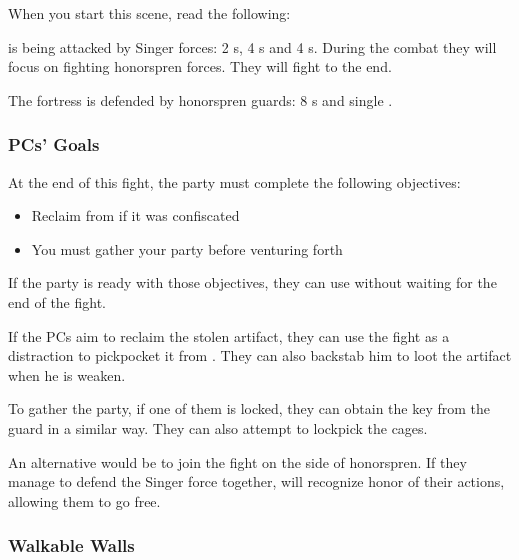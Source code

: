 When you start this scene, read the following:


\locationFidelity{} is being attacked by Singer forces: 2 \enemySingerHaevenlyOne{}s, 4 \enemySingerDireform{}s and 4 \enemySingerStormform{}s. During the combat they will focus on fighting honorspren forces. They will fight to the end.

The fortress is defended by honorspren guards: 8 \enemyTrueSpren{}s and single \enemySprenCaptain{}.

\subsubsection{PCs' Goals}

At the end of this fight, the party must complete the following objectives:
\begin{itemize}
	\item Reclaim \lootGateOpener{} from \npcHonorsprenCaptain{} if it was confiscated
	\item You must gather your party before venturing forth
\end{itemize}

If the party is ready with those objectives, they can use \lootGateOpener{} without waiting for the end of the fight.

If the PCs aim to reclaim the stolen artifact, they can use the fight as a distraction to pickpocket it from \npcHonorsprenCaptain{}. They can also backstab him to loot the artifact when he is weaken.

To gather the party, if one of them is locked, they can obtain the key from the guard in a similar way. They can also attempt to lockpick the cages.

An alternative would be to join the fight on the side of honorspren. If they manage to defend the Singer force together, \npcHonorsprenCaptain{} will recognize honor of their actions, allowing them to go free.

\subsubsection{Walkable Walls}

